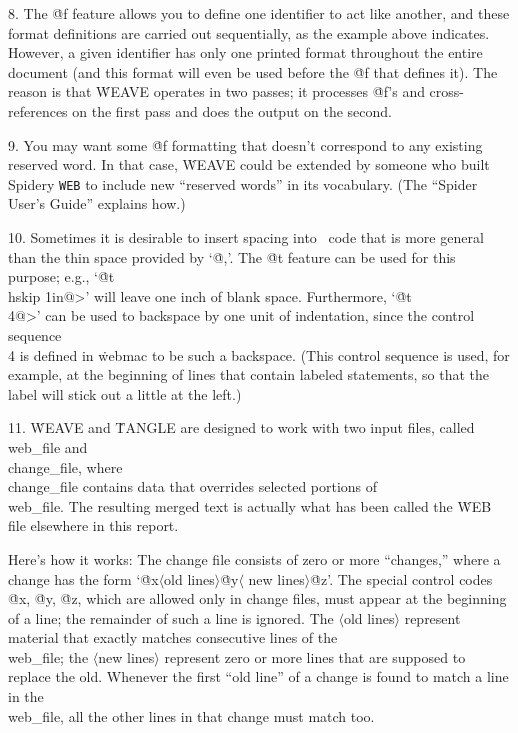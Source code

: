 8.
The \.{@f} feature allows you to define one identifier to act like
another, and these format definitions are carried out sequentially, as the
example above indicates.
However, a given identifier has only one printed format
throughout the entire document (and this format will even be used before
the \.{@f} that defines it).
The reason is that \.{WEAVE} operates in two
passes; it processes \.{@f}'s and cross-references on the first pass and
does the output on the second.

9.
You may want some \.{@f} formatting that doesn't correspond to any
existing reserved word.
In that case, \.{WEAVE} could be extended 
\newstuff
by someone who built Spidery {\tt WEB} 
\endnewstuff
to include new ``reserved words'' in its vocabulary.
\newstuff
(The ``\/{Spider} User's Guide'' explains how.)
\endnewstuff


10.
Sometimes it is desirable to insert spacing into \PASCAL\ code that is
more general than the thin space provided by `\.{@,}'.
The \.{@t} feature
can be used for this purpose; e.g., `\.{@t\\hskip 1in@>}' will
leave one inch of blank space.
Furthermore, `\.{@t\\4@>}' can be
used to backspace by one unit of indentation, since the control sequence
\.{\\4} is defined in \.{webmac} to be such a backspace.
(This
control sequence is used, for example, at the beginning of lines that
contain labeled statements, so that the label will stick out a little at
the left.)

11.
\.{WEAVE} and \.{TANGLE} are designed to work with two input files,
called \\{web\_file} and \\{change\_file}, where \\{change\_file} contains
data that overrides selected portions of \\{web\_file}.
The resulting merged
text is actually what has been called the \.{WEB} file elsewhere in this
report.

Here's how it works: The change file consists of zero or more ``changes,''
where a change has the form `\.{@x}$\langle$old lines$\rangle$\.{@y}$\langle$%
new lines$\rangle$\.{@z}'.
The special control codes \.{@x}, \.{@y}, \.{@z},
which are allowed only in change files, must appear at the beginning of a line;
the remainder of such a line is ignored.
The $\langle$old lines$\rangle$ represent material that exactly matches
consecutive lines of the \\{web\_file}; the $\langle$new lines$\rangle$
represent zero or more lines that are supposed to replace the old.
Whenever
the first ``old line'' of a change is found to match a line in the
\\{web\_file}, all the other lines in that change must match too.

